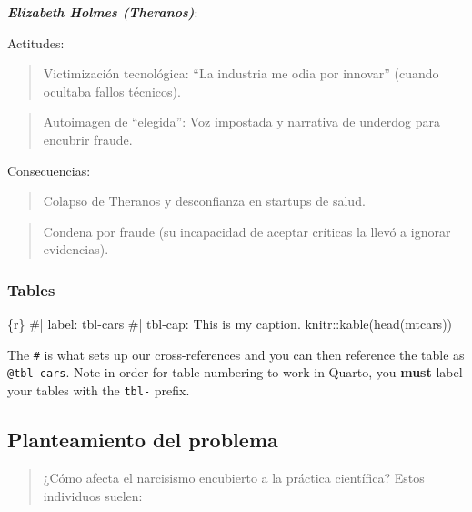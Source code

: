 \documentclass[
]{article}
\newenvironment{Shaded}{\begin{snugshade}}{\end{snugshade}}
\newcommand{\InformationTok}[1]{\textcolor[rgb]{0.37,0.37,0.37}{#1}}
\begin{document}
\textbf{\emph{Elizabeth Holmes (Theranos)}}:

Actitudes:

\begin{quote}
Victimización tecnológica: ``La industria me odia por innovar'' (cuando
ocultaba fallos técnicos).
\end{quote}

\begin{quote}
Autoimagen de ``elegida'': Voz impostada y narrativa de underdog para
encubrir fraude.
\end{quote}

Consecuencias:

\begin{quote}
Colapso de Theranos y desconfianza en startups de salud.
\end{quote}

\begin{quote}
Condena por fraude (su incapacidad de aceptar críticas la llevó a
ignorar evidencias).
\end{quote}

\subsubsection{Tables}\label{tables}

\begin{Shaded}
\begin{Highlighting}[]
\InformationTok{\textasciigrave{}\textasciigrave{}\textasciigrave{}\{r\}}
\InformationTok{\#| label: tbl{-}cars}
\InformationTok{\#| tbl{-}cap: This is my caption.}
\InformationTok{knitr::kable(head(mtcars))}
\InformationTok{\textasciigrave{}\textasciigrave{}\textasciigrave{}}
\end{Highlighting}
\end{Shaded}

The \texttt{\#\textbar{}} is what sets up our cross-references and you
can then reference the table as \texttt{@tbl-cars}. Note in order for
table numbering to work in Quarto, you \textbf{must} label your tables
with the \texttt{tbl-} prefix.

\subsection{Planteamiento del
problema}\label{planteamiento-del-problema}

\begin{quote}
¿Cómo afecta el narcisismo encubierto a la práctica científica? Estos
individuos suelen:
\end{quote}
\end{document}
